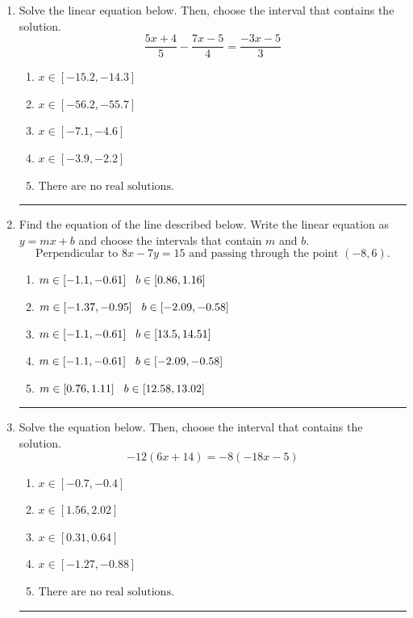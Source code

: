 \documentclass[14pt]{extbook}
\newcommand{\litem}[1]{\item#1\hspace*{-1cm}\rule{\textwidth}{0.4pt}}
\begin{document}
\begin{enumerate}
{\begin{enumerate}[label=\Alph*.]
\end{enumerate} }
\litem{
Solve the linear equation below. Then, choose the interval that contains the solution.\[ \frac{5x + 4}{5} - \frac{7x -5}{4} = \frac{-3x -5}{3} \]\begin{enumerate}[label=\Alph*.]
\item \( x \in [-15.2, -14.3] \)
\item \( x \in [-56.2, -55.7] \)
\item \( x \in [-7.1, -4.6] \)
\item \( x \in [-3.9, -2.2] \)
\item \( \text{There are no real solutions.} \)

\end{enumerate} }
\litem{
Find the equation of the line described below. Write the linear equation as $ y=mx+b $ and choose the intervals that contain $m$ and $b$.\[ \text{Perpendicular to } 8 x - 7 y = 15 \text{ and passing through the point } (-8, 6). \]\begin{enumerate}[label=\Alph*.]
\item \( m \in [-1.1, -0.61] \hspace*{3mm} b \in [0.86, 1.16] \)
\item \( m \in [-1.37, -0.95] \hspace*{3mm} b \in [-2.09, -0.58] \)
\item \( m \in [-1.1, -0.61] \hspace*{3mm} b \in [13.5, 14.51] \)
\item \( m \in [-1.1, -0.61] \hspace*{3mm} b \in [-2.09, -0.58] \)
\item \( m \in [0.76, 1.11] \hspace*{3mm} b \in [12.58, 13.02] \)

\end{enumerate} }
\litem{
Solve the equation below. Then, choose the interval that contains the solution.\[ -12(6x + 14) = -8(-18x -5) \]\begin{enumerate}[label=\Alph*.]
\item \( x \in [-0.7, -0.4] \)
\item \( x \in [1.56, 2.02] \)
\item \( x \in [0.31, 0.64] \)
\item \( x \in [-1.27, -0.88] \)
\item \( \text{There are no real solutions.} \)


\end{enumerate}}
\end{enumerate}
\end{document}
